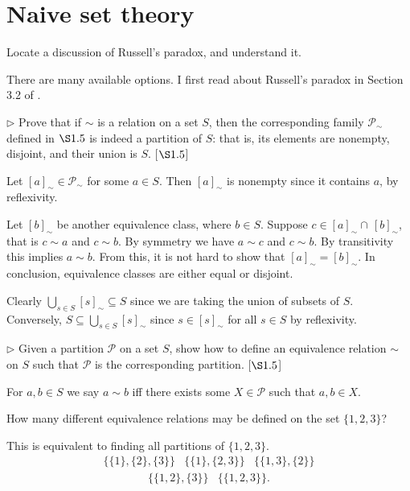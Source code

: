 \section{Naive set theory}
\extitle
\begin{exercise}
	Locate a discussion of Russell's paradox, and understand it.
\end{exercise}
\begin{solution}
	There are many available options. I first read about Russell's paradox in Section 3.2 of \cite{tao2014analysis}.
\end{solution}
\begin{exercise}
	$\triangleright$ Prove that if $\sim$ is a relation on a set $S$, then the corresponding family $\mathscr{P}_{\sim}$ defined in $\S1.5$  is indeed a partition of $S$: that is, its elements are nonempty, disjoint, and their union is $S$. [$\S1.5$]
\end{exercise}
\begin{solution}
	Let $[a]_\sim\in \mathscr{P}_{\sim}$ for some $a\in S$. Then $[a]_\sim$ is nonempty since it contains $a$, by reflexivity. 
	
	Let $[b]_\sim$ be another equivalence class, where $b\in S$. Suppose $c\in [a]_\sim \cap\, [b]_\sim$, that is $c\sim a$ and $c \sim b$. By symmetry we have $a \sim c$ and $c \sim b$. By transitivity this implies $a\sim b$. From this, it is not hard to show that $[a]_\sim = [b]_\sim$. In conclusion, equivalence classes are either equal or disjoint.
	
	Clearly $\bigcup_{s\in S} [s]_\sim \subseteq S$ since we are taking the union of subsets of $S$. Conversely, $S\subseteq \bigcup_{s\in S} [s]_\sim$ since $s\in [s]_{\sim}$ for all $s\in S$ by reflexivity. 
\end{solution}
\begin{exercise}
	$\triangleright$ Given a partition $\mathscr{P}$ on a set $S$, show how to define an equivalence relation $\sim$ on $S$ such that $\mathscr{P}$ is the corresponding partition. [$\S1.5$]
\end{exercise}
\begin{solution}
	For $a,b\in S$ we say $a\sim b$ iff there exists some $X \in \mathscr{P}$ such that $a,b\in X$. 
\end{solution}
\begin{exercise}
	How many different equivalence relations may be defined on the set $\{1,2,3\}$?
\end{exercise}
\begin{solution}
	This is equivalent to finding all partitions of $\{1,2,3\}$.
	\[
	\begin{matrix}
		\{\{1\},\{2\},\{3\}\} & \{\{1\}, \{2,3\}\} & \{\{1,3\},\{2\}\}
	\end{matrix}
	\]
	\[
		\begin{matrix}
			\{\{1,2\},\{3\}\} & \{\{1,2,3\}\}.
		\end{matrix}
	\]
\end{solution}
